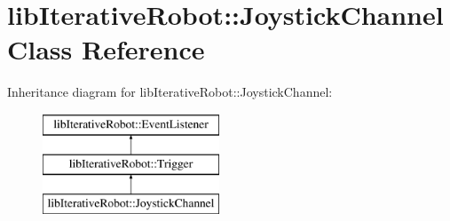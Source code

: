 \hypertarget{classlib_iterative_robot_1_1_joystick_channel}{}\section{lib\+Iterative\+Robot\+::Joystick\+Channel Class Reference}
\label{classlib_iterative_robot_1_1_joystick_channel}
Inheritance diagram for lib\+Iterative\+Robot\+::Joystick\+Channel\+:\begin{figure}[H]
\begin{center}
\leavevmode
\includegraphics[height=3.000000cm]{classlib_iterative_robot_1_1_joystick_channel}
\end{center}
\end{figure}
